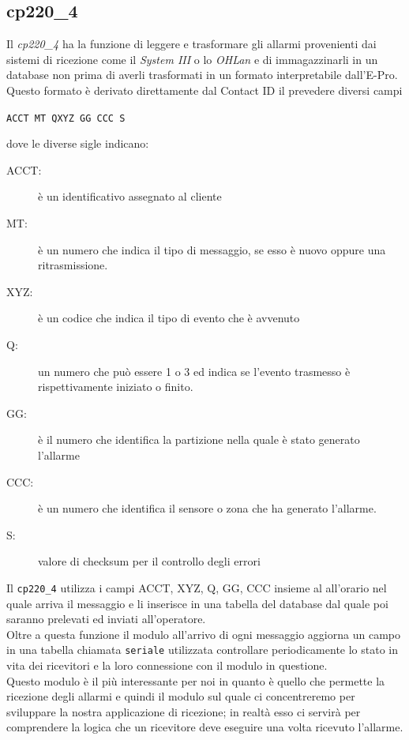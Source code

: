 \subsection{cp220\_4}
Il \emph{cp220\_4} ha la funzione di leggere e trasformare gli allarmi provenienti dai sistemi di ricezione come il \emph{System III} o lo \emph{OHLan} e di immagazzinarli in un database non prima di averli trasformati in un formato interpretabile dall'E-Pro. Questo formato è derivato direttamente dal Contact ID il prevedere diversi campi
\begin{center}
	\texttt{ACCT MT QXYZ GG CCC S}
\end{center}
dove le diverse sigle indicano:
\begin{description}
	\item[ACCT:] è un identificativo assegnato al cliente
	\item[MT:] è un numero che indica il tipo di messaggio, se esso è nuovo oppure una ritrasmissione.
	\item[XYZ:] è un codice che indica il tipo di evento che è avvenuto
	\item[Q:] un numero che può essere 1 o 3 ed indica se l'evento trasmesso è rispettivamente iniziato o finito.
	\item[GG:] è il numero che identifica la partizione nella quale è stato generato l'allarme
	\item[CCC:] è un numero che identifica il sensore o zona che ha generato l'allarme.
	\item[S:] valore di checksum per il controllo degli errori
\end{description}
Il \texttt{cp220\_4} utilizza i campi ACCT, XYZ, Q, GG, CCC insieme al all'orario nel quale arriva il messaggio e li inserisce in una tabella del database dal quale poi saranno prelevati ed inviati all'operatore.\\
Oltre a questa funzione il modulo all'arrivo di ogni messaggio aggiorna un campo in una tabella chiamata \texttt{seriale} utilizzata controllare periodicamente lo stato in vita dei ricevitori e la loro connessione con il modulo in questione.\\
Questo modulo è il più interessante per noi in quanto è quello che permette la ricezione degli allarmi e quindi il modulo sul quale ci concentreremo per sviluppare la nostra applicazione di ricezione; in realtà esso ci servirà per comprendere la logica che un ricevitore deve eseguire una volta ricevuto l'allarme.
